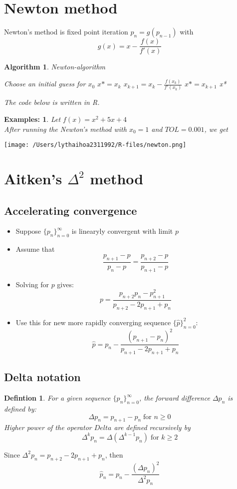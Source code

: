 \documentclass[12pt]{article}
\newtheorem{alg}[theorem]{Algorithm}
\newtheorem*{ex}{Examples:}
\newtheorem*{definition}{Defintion}
\begin{document}
\section{Newton method}
Newton's method is fixed point iteration $p_n = g(p_{n-1})$ with $$g(x) = x - \frac{f(x)}{f'(x)}$$
\begin{alg}{Newton-algorithm}
\begin{algorithmic}
Choose an initial guess for $x_0$
\State $x* = x_{k}$
\State $x_{k+1} = x_k - \frac{f(x_k)}{f'(x_k)}$
\State $x* = x_{k+1}$
\State \Return x*
\EndIf
\EndFor	
\end{algorithmic}
The code below is written in R.
	
\end{alg}
\begin{ex}
Let $f(x) = x^2 + 5x +4$ \\
After running the Newton's method with $x_0 = 1$ and $TOL = 0.001$, we get 	
\end{ex}
\begin{figure*}[ht!]
\centering 
\texttt{[image: /Users/lythaihoa2311992/R-files/newton.png]}
\caption{$f(x) = x^2 +5x +4$}	
\end{figure*}







\section{Aitken's $\Delta^2$ method}
\subsection{Accelerating convergence}
\begin{itemize}
	\item Suppose $\{p_n\}_{n=0}^{\infty}$ is linearyly convergent with limit $p$
	\item Assume that $$\frac{p_{n+1}-p}{p_n -p} = \frac{p_{n+2}-p}{p_{n+1} -p}$$
	\item Solving for $p$ gives: $$p = \frac{p_{n+2}p_n-p_{n+1}^2}{p_{n+2} -2p_{n+1}+p_n}$$
	\item Use this for new more rapidly converging sequence $\{\hat{p}\}_{n=0}^2$: $$\hat{p} = p_n -\frac{(p_{n+1} -p_n)^2}{p_{n+1} -2p_{n+1} +p_n}$$
\end{itemize}

\subsection{Delta notation}
\begin{definition}
	For a given sequence $\{p_n\}_{n=0}^{\infty}$, the forward difference $\Delta p_n$ is defined by:
	$$\Delta p_n = p_{n+1} - p_n \; \text{for $n \geq 0$}$$
	Higher power of the operator $Delta$ are defined recursively by $$\Delta^kp_n = \Delta(\Delta^{k-1}p_n) \; \text{for $k \geq 2$}$$
	\end{definition}
Since $\Delta^2p_n = p_{n+2} -2p_{n+1} + p_n$, then $$\hat{p}_n = p_n - \frac{(\Delta p_n)^2}{\Delta^2 p_n}$$
\end{document}
